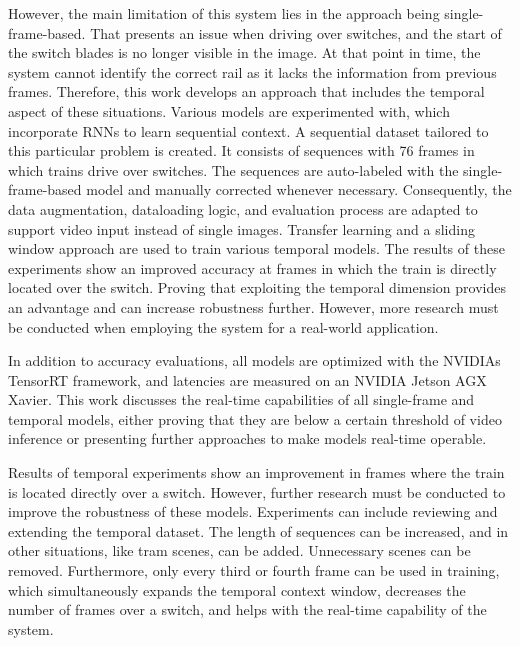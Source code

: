 However, the main limitation of this system lies in the approach being single-frame-based.
That presents an issue when driving over switches, and the start of the switch blades is no longer visible in the image.
At that point in time, the system cannot identify the correct rail as it lacks the information from previous frames.
Therefore, this work develops an approach that includes the temporal aspect of these situations.
Various models are experimented with, which incorporate \ac{RNN}s to learn sequential context.
A sequential dataset tailored to this particular problem is created.
It consists of sequences with 76 frames in which trains drive over switches.
The sequences are auto-labeled with the single-frame-based model and manually corrected whenever necessary.
Consequently, the data augmentation, dataloading logic, and evaluation process are adapted to support video input instead of single images.
Transfer learning and a sliding window approach are used to train various temporal models.
The results of these experiments show an improved accuracy at frames in which the train is directly located over the switch.
Proving that exploiting the temporal dimension provides an advantage and can increase robustness further.
However, more research must be conducted when employing the system for a real-world application.

In addition to accuracy evaluations, all models are optimized with the NVIDIAs TensorRT framework, and latencies are measured on an NVIDIA Jetson AGX Xavier.
This work discusses the real-time capabilities of all single-frame and temporal models, either proving that they are below a certain threshold of video inference or presenting further approaches to make models real-time operable.

\vspace{2cm}

\noindent Results of temporal experiments show an improvement in frames where the train is located directly over a switch.
However, further research must be conducted to improve the robustness of these models.
Experiments can include reviewing and extending the temporal dataset.
The length of sequences can be increased, and in other situations, like tram scenes, can be added.
Unnecessary scenes can be removed.
Furthermore, only every third or fourth frame can be used in training, which simultaneously expands the temporal context window, decreases the number of frames over a switch, and helps with the real-time capability of the system.

